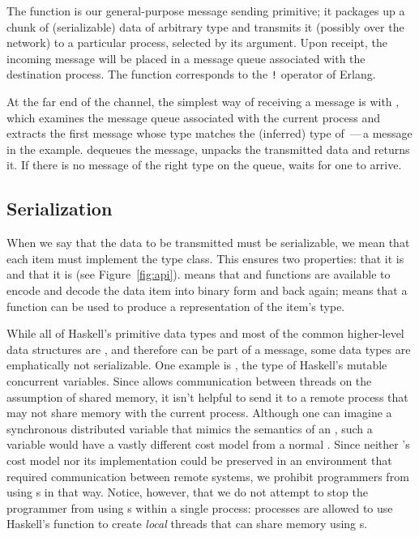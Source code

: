 \documentclass[preprint]{sigplanconf}
\begin{document}
The  function is our general-purpose message sending primitive; it packages up a chunk of (serializable) data of arbitrary type and transmits it (possibly over the network) to a particular process, selected by its  argument.
Upon receipt, the incoming message will be placed in a message queue associated with the destination process. 
The  function corresponds to the \texttt{!} operator of Erlang.

At the far end of the channel, the simplest way of receiving a message is with , which
examines the message queue associated with the current process and extracts the first message whose type matches the (inferred) type of \,---\,a  message in the example.  
 dequeues the message, unpacks the transmitted data and returns it.
If there is no message of the right type on the queue,  waits for one to arrive.

\subsection{Serialization} 
\label{s:serialization}

When we say that the data to be transmitted must be serializable, we mean that each item must implement the  type class.  This ensures two properties: that it is  and that it is  (see Figure~\ref{fig:api}).
 means that  and  functions are available to encode and decode the data  item into binary form and back again;  means that a function  can be used to produce a representation of the item's type.  

While all of Haskell's primitive data types and most of the common higher-level data structures are , and therefore can be part of a message, some data types are emphatically not serializable. One example is , the type of Haskell's mutable concurrent variables. Since  allows communication between threads on the assumption of shared memory, it isn't helpful to send it to a remote process that may not share memory with the current process. Although one can imagine a synchronous distributed variable that mimics the semantics of an , such a variable would have a vastly different cost model from a normal . Since neither 's cost model nor its implementation could be preserved in an environment that required communication between remote systems, we  prohibit programmers from using s in that way.  Notice, however, that we do not attempt to stop the programmer from using s within a single process: processes are allowed to use Haskell's  function to create \emph{local} threads that can share memory using s.
\end{document}
